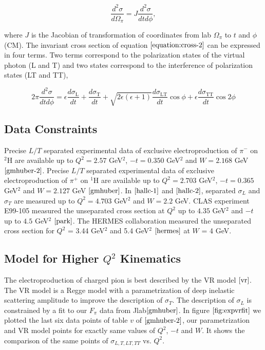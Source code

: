 \documentclass{article}
\begin{document}
\begin{equation}
  \frac{d^2 \sigma}{d\Omega_\pi}= J \frac{d^2 \sigma}{dt d\phi},
  \label{equation:cross-2}
\end{equation}

where $J$ is the Jacobian of transformation of coordinates from lab $\Omega_{\pi}$ to $t$ and $\phi$ (CM). The invariant cross section 
of equation $\ref{equation:cross-2}$ can be expressed in four terms. Two terms correspond to the polarization states of the virtual 
photon (L and T) and two states correspond to the interference of polarization states (LT and TT),

\begin{equation}
  2\pi \frac{d^2 \sigma}{dt d\phi} =  \epsilon  \frac{d\sigma_{\mathrm{L}}}{dt} + \frac{d\sigma_{\mathrm{T}}}{dt} + 
  \sqrt{2\epsilon (\epsilon +1)} \frac{d\sigma_{\mathrm{LT}}}{dt} \cos{\phi} + \epsilon  \frac{d\sigma_{\mathrm{TT}}}{dt} \cos{2 \phi}
  \label{equation:cross-3}
\end{equation}

\subsection{Data Constraints}
Precise $L/T$ separated experimental data of exclusive electroproduction of $\pi^{-}$ on $^2$H are available up to $Q^2 = 2.57$ GeV$^2$, 
$-t = 0.350$ GeV$^2$ and $W = 2.168$ GeV $\cite{gmhuber-2}$. Precise $L/T$ separated experimental data of exclusive electroproduction 
of $\pi^{+}$ on $^1$H are available up to $Q^2 = 2.703$ GeV$^2$, $-t = 0.365$ GeV$^2$ and $W = 2.127$ GeV $\cite{gmhuber}$. In $\cite{hallc-1}$ 
and $\cite{hallc-2}$, separated $\sigma_{L}$ and $\sigma_{T}$ are measured up to $Q^2 = 4.703$ GeV$^2$ and $W = 2.2$ GeV. CLAS 
experiment E99-105 measured the unseparated cross section at $Q^2$ up to $4.35$ GeV$^2$ and $-t$ up to $4.5$ GeV$^2$ $\cite{park}$. 
The HERMES collaboration measured the unseparated cross section for $Q^2$ = 3.44 GeV$^2$ and 5.4 GeV$^2$ $\cite{hermes}$ at $W$ = 4 
GeV. 

\subsection{Model for Higher $Q^2$ Kinematics}
The electroproduction of charged pion is best described by the VR model $\cite{vr}$. The VR model is a 
Regge model with a parametrization of deep inelastic scattering amplitude to improve the description of $\sigma_{T}$. The 
description of $\sigma_{L}$ is constrained by a fit to our $F_{\pi}$ data from Jlab$\cite{gmhuber}$. In figure $\ref{fig:expvrfit}$ we plotted the 
last six data points of table $v$ of $\cite{gmhuber-2}$, our parametrization and VR model points for exactly same 
values of $Q^2$, $-t$ and $W$. It shows the comparison of the same points of $\sigma_{L,T,LT,TT}$ vs. $Q^{2}$. 
\end{document}
